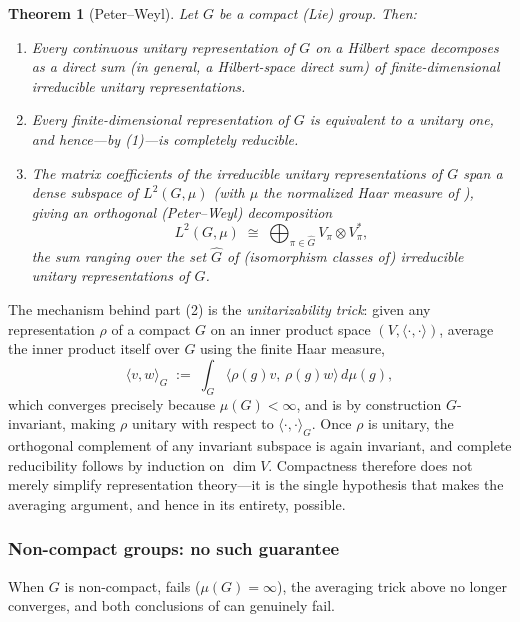 \documentclass[11pt]{article}
\theoremstyle{plain}
\newtheorem{Theorem}{Theorem}[section]
\theoremstyle{definition}
\begin{document}
\begin{Theorem}[Peter--Weyl]
\label{thm:peter-weyl}
Let $G$ be a compact (Lie) group. Then:
\begin{enumerate}
    \item Every continuous unitary representation of $G$ on a Hilbert space
    decomposes as a direct sum (in general, a Hilbert-space direct sum) of
    finite-dimensional irreducible unitary representations.
    \item Every finite-dimensional representation of $G$ is equivalent to a
    unitary one, and hence---by (1)---is completely reducible.
    \item The matrix coefficients of the irreducible unitary representations
    of $G$ span a dense subspace of $L^2(G,\mu)$ (with $\mu$ the normalized
    Haar measure of ), giving an
    orthogonal (Peter--Weyl) decomposition
    \[
        L^2(G,\mu) \;\cong\; \bigoplus_{\pi \in \widehat{G}} V_\pi \otimes V_\pi^*,
    \]
    the sum ranging over the set $\widehat{G}$ of (isomorphism classes of)
    irreducible unitary representations of $G$.
\end{enumerate}
\end{Theorem}

The mechanism behind part (2) is the \emph{unitarizability trick}: given any
representation $\rho$ of a compact $G$ on an inner product space $(V,
\langle\cdot,\cdot\rangle)$, average the inner product itself over $G$ using
the finite Haar measure,
\[
    \langle v, w \rangle_G \;:=\; \int_G \langle \rho(g)v,\, \rho(g)w \rangle \, d\mu(g),
\]
which converges precisely because $\mu(G) < \infty$, and is by construction
$G$-invariant, making $\rho$ unitary with respect to $\langle\cdot,\cdot\rangle_G$.
Once $\rho$ is unitary, the orthogonal complement of any invariant subspace
is again invariant, and complete reducibility follows by induction on
$\dim V$. Compactness therefore does not merely simplify representation
theory---it is the single hypothesis that makes the averaging argument, and
hence  in its entirety, possible.

\subsubsection{Non-compact groups: no such guarantee}
\label{subsubsec:noncompact-representations}

When $G$ is non-compact,  fails
($\mu(G) = \infty$), the averaging trick above no longer converges, and both
conclusions of  can genuinely fail.
\end{document}
